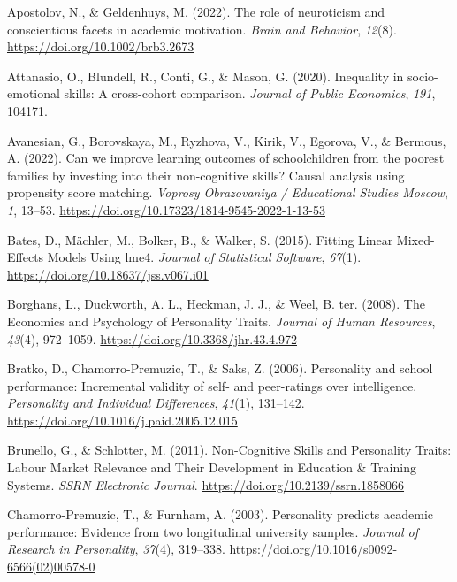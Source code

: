 \documentclass[
  12pt,
  a4paper,
]{article}
\newlength{\cslhangindent}
\newlength{\cslentryspacingunit} %
\newenvironment{CSLReferences}[2] %
 {%
  \setlength{\parindent}{0pt}
  \ifodd #1
  \let\oldpar\par
  \def\par{\hangindent=\cslhangindent\oldpar}
  \fi
  \setlength{\parskip}{#2\cslentryspacingunit}
 }%
 {}
\begin{document}
\hypertarget{refs}{}
\begin{CSLReferences}{1}{0}
\leavevmode{}%
Apostolov, N., \& Geldenhuys, M. (2022). The role of neuroticism and
conscientious facets in academic motivation. \emph{Brain and Behavior},
\emph{12}(8). \url{https://doi.org/10.1002/brb3.2673}

\leavevmode{}%
Attanasio, O., Blundell, R., Conti, G., \& Mason, G. (2020). Inequality
in socio-emotional skills: A cross-cohort comparison. \emph{Journal of
Public Economics}, \emph{191}, 104171.

\leavevmode{}%
Avanesian, G., Borovskaya, M., Ryzhova, V., Kirik, V., Egorova, V., \&
Bermous, A. (2022). Can we improve learning outcomes of schoolchildren
from the poorest families by investing into their non-cognitive skills?
Causal analysis using propensity score matching. \emph{Voprosy
Obrazovaniya / Educational Studies Moscow}, \emph{1}, 13--53.
\url{https://doi.org/10.17323/1814-9545-2022-1-13-53}

\leavevmode{}%
Bates, D., Mächler, M., Bolker, B., \& Walker, S. (2015). Fitting Linear
Mixed-Effects Models Using lme4. \emph{Journal of Statistical Software},
\emph{67}(1). \url{https://doi.org/10.18637/jss.v067.i01}

\leavevmode{}%
Borghans, L., Duckworth, A. L., Heckman, J. J., \& Weel, B. ter. (2008).
The Economics and Psychology of Personality Traits. \emph{Journal of
Human Resources}, \emph{43}(4), 972--1059.
\url{https://doi.org/10.3368/jhr.43.4.972}

\leavevmode{}%
Bratko, D., Chamorro-Premuzic, T., \& Saks, Z. (2006). Personality and
school performance: Incremental validity of self- and peer-ratings over
intelligence. \emph{Personality and Individual Differences},
\emph{41}(1), 131--142. \url{https://doi.org/10.1016/j.paid.2005.12.015}

\leavevmode{}%
Brunello, G., \& Schlotter, M. (2011). Non-Cognitive Skills and
Personality Traits: Labour Market Relevance and Their Development in
Education \& Training Systems. \emph{SSRN Electronic Journal}.
\url{https://doi.org/10.2139/ssrn.1858066}

\leavevmode{}%
Chamorro-Premuzic, T., \& Furnham, A. (2003). Personality predicts
academic performance: Evidence from two longitudinal university samples.
\emph{Journal of Research in Personality}, \emph{37}(4), 319--338.
\url{https://doi.org/10.1016/s0092-6566(02)00578-0}


\end{CSLReferences}
\end{document}
